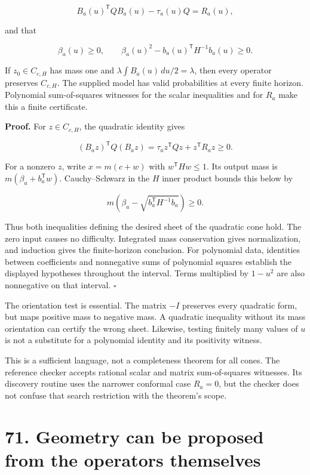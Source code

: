 \documentclass[11pt,letterpaper]{article}
\begin{document}
\[
\boxed{B_a(u)^{\mathsf T}QB_a(u)-\tau_a(u)Q=R_a(u),}
\]

and that

\[
\boxed{\beta_a(u)\geq0,\qquad
\beta_a(u)^2-b_a(u)^{\mathsf T}H^{-1}b_a(u)\geq0.}
\]

If \(z_0\in C_{c,H}\) has mass one and
\(\lambda\int B_a(u)\,du/2=\lambda\), then every operator preserves
\(C_{c,H}\). The supplied model has valid probabilities at every finite
horizon. Polynomial sum-of-squares witnesses for the scalar inequalities
and for \(R_a\) make this a finite certificate.

\textbf{Proof.} For \(z\in C_{c,H}\), the quadratic identity gives

\[
(B_a z)^{\mathsf T}Q(B_a z)
=\tau_a z^{\mathsf T}Qz+z^{\mathsf T}R_a z\geq0.
\]

For a nonzero \(z\), write \(x=m(c+w)\) with \(w^{\mathsf T}Hw\leq1\).
Its output mass is \(m(\beta_a+b_a^{\mathsf T}w)\). Cauchy--Schwarz in
the \(H\) inner product bounds this below by

\[
m\left(\beta_a-\sqrt{b_a^{\mathsf T}H^{-1}b_a}\right)\geq0.
\]

Thus both inequalities defining the desired sheet of the quadratic cone
hold. The zero input causes no difficulty. Integrated mass conservation
gives normalization, and induction gives the finite-horizon conclusion.
For polynomial data, identities between coefficients and nonnegative
sums of polynomial squares establish the displayed hypotheses throughout
the interval. Terms multiplied by \(1-u^2\) are also nonnegative on that
interval. \(\square\)

The orientation test is essential. The matrix \(-I\) preserves every
quadratic form, but maps positive mass to negative mass. A quadratic
inequality without its mass orientation can certify the wrong sheet.
Likewise, testing finitely many values of \(u\) is not a substitute for
a polynomial identity and its positivity witness.

This is a sufficient language, not a completeness theorem for all cones.
The reference checker accepts rational scalar and matrix sum-of-squares
witnesses. Its discovery routine uses the narrower conformal case
\(R_a=0\), but the checker does not confuse that search restriction with
the theorem's scope.

\section{71. Geometry can be proposed from the operators
themselves}\label{geometry-can-be-proposed-from-the-operators-themselves}
\end{document}
